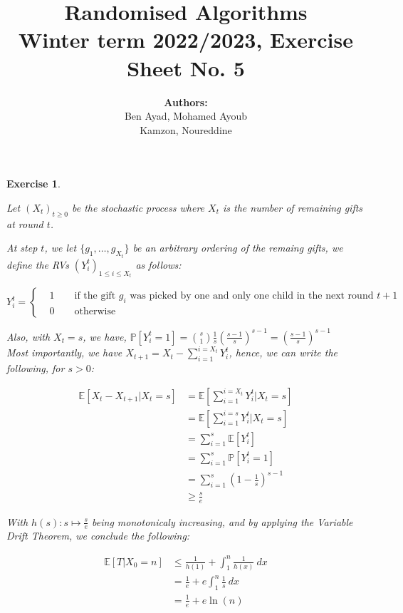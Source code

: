 \documentclass{article}
\title{Randomised Algorithms \\
Winter term 2022/2023, Exercise Sheet No. 5}
\author{
    \textbf{Authors:} \\
    Ben Ayad, Mohamed Ayoub \\
    Kamzon, Noureddine
}
\newtheorem{exo}{Exercise}
\def\P{\mathbb{P}}
\def\E{\mathbb{E}}
\begin{document}
\maketitle

\begin{exo}{\ \\}

Let $(X_t)_{t\geq0}$ be the stochastic process where $X_t$ is the number of remaining gifts at round $t$.

\noindent
At step $t$, we let $\{g_1, \dots, g_{X_t}\}$ be an arbitrary ordering of the remaing gifts, we define the RVs $(Y_i^{t})_{1\leq i\leq X_t}$ as follows: 

\[   
Y_i^{t} = 
\begin{cases}
    &1 \quad \quad \text{if the gift $g_i$ was picked by one and only one child in the next round $t+1$} \\
    &0 \quad \quad \text{otherwise}
\end{cases}
\]

Also, with $X_t = s$, we have, $\P[Y_i^t = 1] = \binom{s}{1} \frac{1}{s} (\frac{s-1}{s})^{s-1} = (\frac{s-1}{s})^{s-1}$   \\

Most importantly, we have $X_{t+1} = X_t - \sum_{i=1}^{i=X_t} Y_i^{t} $, hence, we can write the following, for $s>0$:

\begin{align*}
    \E[X_t-X_{t+1}| X_t=s] 
    &= \E[\sum_{i=1}^{i=X_t} Y_i^t| X_t = s] \\
    &= \E[\sum_{i=1}^{i=s} Y_i^t| X_t = s] \\
    &= \sum_{i=1}^{s} \E[Y_i^t] \\
    &= \sum_{i=1}^{s} \P[Y_i^t = 1] \\
    &= \sum_{i=1}^{s} (1 - \frac{1}{s})^{s-1} \\
    &\geq \frac{s}{e} 
\end{align*}

With $h(s): s \mapsto \frac{s}{e}$ being monotonicaly increasing, and by applying the Variable Drift Theorem, we conclude the following:

\begin{align*}
    \E[T|X_0=n]
    &\leq \frac{1}{h(1)} + \int_{{1}}^{{n}} {\frac{1}{h(x)} } \: d{x} \\
    &= \frac{1}{e} + e \int_{{1}}^{{n}} {\frac{1}{s} } \: d{x} \\
    &= \frac{1}{e} + e \ln(n) \\ 
\end{align*}
\end{exo}
\end{document}
